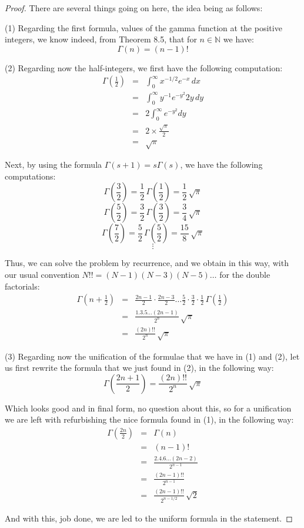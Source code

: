 \documentclass[12pt]{amsbook}
\begin{document}
\begin{proof}
There are several things going on here, the idea being as follows:

\medskip

(1) Regarding the first formula, values of the gamma function at the positive integers, we know indeed, from Theorem 8.5, that for $n\in\mathbb N$ we have:
$$\Gamma(n)=(n-1)!$$

(2) Regarding now the half-integers, we first have the following computation:
\begin{eqnarray*}
\Gamma\left(\frac{1}{2}\right)
&=&\int_0^\infty x^{-1/2}e^{-x}\,dx\\
&=&\int_0^\infty y^{-1}e^{-y^2}2y\,dy\\
&=&2\int_0^\infty e^{-y^2}dy\\
&=&2\times\frac{\sqrt{\pi}}{2}\\
&=&\sqrt{\pi}
\end{eqnarray*}

Next, by using the formula $\Gamma(s+1)=s\Gamma(s)$, we have the following computations:
$$\Gamma\left(\frac{3}{2}\right)=\frac{1}{2}\,\Gamma\left(\frac{1}{2}\right)=\frac{1}{2}\,\sqrt{\pi}$$
$$\Gamma\left(\frac{5}{2}\right)=\frac{3}{2}\,\Gamma\left(\frac{3}{2}\right)=\frac{3}{4}\,\sqrt{\pi}$$
$$\Gamma\left(\frac{7}{2}\right)=\frac{5}{2}\,\Gamma\left(\frac{5}{2}\right)=\frac{15}{8}\,\sqrt{\pi}$$
$$\vdots$$

Thus, we can solve the problem by recurrence, and we obtain in this way, with our usual convention $N!!=(N-1)(N-3)(N-5)\ldots$ for the double factorials:
\begin{eqnarray*}
\Gamma\left(n+\frac{1}{2}\right)
&=&\frac{2n-1}{2}\cdot\frac{2n-3}{2}\ldots\frac{5}{2}\cdot\frac{3}{2}\cdot\frac{1}{2}\,\Gamma\left(\frac{1}{2}\right)\\
&=&\frac{1.3.5\ldots(2n-1)}{2^n}\,\sqrt{\pi}\\
&=&\frac{(2n)!!}{2^n}\,\sqrt{\pi}
\end{eqnarray*}

(3) Regarding now the unification of the formulae that we have in (1) and (2), let us first rewrite the formula that we just found in (2), in the following way:
$$\Gamma\left(\frac{2n+1}{2}\right)=\frac{(2n)!!}{2^n}\,\sqrt{\pi}$$

Which looks good and in final form, no question about this, so for a unification we are left with refurbishing the nice formula found in (1), in the following way:
\begin{eqnarray*}
\Gamma\left(\frac{2n}{2}\right)
&=&\Gamma(n)\\
&=&(n-1)!\\
&=&\frac{2.4.6\ldots(2n-2)}{2^{n-1}}\\
&=&\frac{(2n-1)!!}{2^{n-1}}\\
&=&\frac{(2n-1)!!}{2^{n-1/2}}\,\sqrt{2}
\end{eqnarray*}

And with this, job done, we are led to the uniform formula in the statement.
\end{proof}
\end{document}
